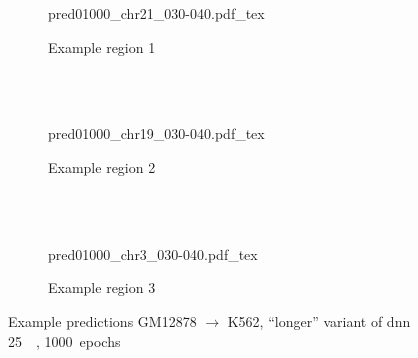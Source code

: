 \begin{figure}[p]
    \begin{subfigure}{\textwidth}
        \centering
        \scriptsize
        {pred01000_chr21_030-040.pdf_tex}
        \caption{Example  region 1} \label{fig:results:longer_r1}
    \end{subfigure}\\[2mm]
    \\[3mm]
    \begin{subfigure}{\textwidth}
        \centering
        \scriptsize
        {pred01000_chr19_030-040.pdf_tex}
        \caption{Example region 2} \label{fig:results:longer_r2}
    \end{subfigure}\\[2mm]
    \\[3mm]
    \begin{subfigure}{\textwidth}
        \centering
        \scriptsize
        {pred01000_chr3_030-040.pdf_tex}
        \caption{Example region 3} \label{fig:results:longer_r3}
    \end{subfigure}
    \caption{Example predictions GM12878 $\rightarrow$ K562, ``longer'' variant of \acrshort{dnn} \SI{25}{\kilo\bp}, 1000~epochs} \label{fig:results:longer_matrices}
\end{figure}

